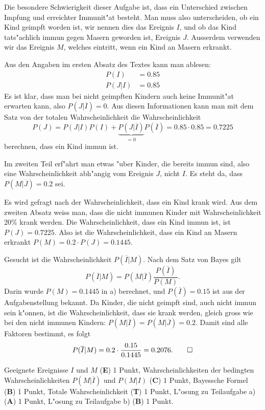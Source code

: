 \begin{loesung}
Die besondere Schwierigkeit dieser Aufgabe ist, dass ein Unterschied
zwischen Impfung und erreichter Immunit"at besteht.
Man muss also unterscheiden, ob ein Kind geimpft worden ist, wir nennen
dies das Ereignis $I$, und ob das Kind tats"achlich immun gegen Masern
geworden ist, Ereignis $J$. 
Ausserdem verwenden wir das Ereignis $M$, welches eintritt, wenn ein
Kind an Masern erkrankt.

Aus den Angaben im ersten Absatz des Textes kann man ablesen:
\begin{align*}
P(I)&=0.85
\\
P(J|I)&=0.85
\end{align*}
Es ist klar, dass man bei nicht geimpften Kindern auch keine Immunit"at
erwarten kann, also $P(J|\overline{I})=0$.
Aus diesen Informationen kann man mit dem Satz von der totalen
Wahrscheinlichkeit
die Wahrscheinlichkeit
\[
P(J)
=
P(J|I)P(I) + \underbrace{P(J|\overline{I})}_{\displaystyle=0}P(\overline{I})
= 
0.85 \cdot 0.85=0.7225
\]
berechnen, dass ein Kind immun ist.

Im zweiten Teil erf"ahrt man etwas "uber Kinder, die bereits immun sind,
also eine Wahrscheinlichkeit abh"angig vom Ereignis $J$, nicht $I$.
Es steht da, dass $P(M|\overline{J})=0.2$ sei.

\begin{teilaufgaben}
\item
Es wird gefragt nach der Wahrscheinlichkeit, dass ein Kind krank wird.
Aus dem zweiten Absatz weiss man, dass die nicht immunen Kinder mit
Wahrscheinlichkeit 20\% krank werden.
Die Wahrscheinlichkeit, dass ein Kind immun ist, ist $P(J)=0.7225$.
Also ist die Wahrscheinlichkeit, dass ein Kind an Masern erkrankt
$P(M)=0.2\cdot P(J)=0.1445$.
\item
Gesucht ist die Wahrscheinlichkeit $P(\overline{I}|M)$.
Nach dem Satz von Bayes gilt
\[
P(\overline{I}|M)
=
P(M|\overline{I})\frac{P(\overline{I})}{P(M)}.
\]
Darin wurde $P(M)=0.1445$ in a) berechnet, und $P(\overline{I})=0.15$
ist aus der Aufgabenstellung bekannt.
Da Kinder, die nicht geimpft sind, auch nicht immun sein k"onnen,
ist die Wahrscheinlichkeit, dass sie krank werden, gleich gross wie
bei den nicht immunen Kindern: $P(M|\overline{I})=P(M|\overline{J})=0.2$.
Damit sind alle Faktoren bestimmt, es folgt
\[
P(\overline{I}|M)
=
0.2\cdot\frac{0.15}{0.1445}
=
0.2076.
\qedhere
\]
\end{teilaufgaben}
\end{loesung}

\begin{bewertung}
Geeignete Ereignisse $I$ und $M$ ({\bf E}) 1 Punkt,
Wahrscheinlichkeiten der bedingten Wahrscheinlichkeiten $P(M|\overline{I})$
und $P(M|I)$ ({\bf C}) 1 Punkt,
Bayessche Formel ({\bf B}) 1 Punkt,
Totale Wahrscheinlichkeit ({\bf T}) 1 Punkt,
L"osung zu Teilaufgabe a) ({\bf A}) 1 Punkt,
L"osung zu Teilaufgabe b) ({\bf B}) 1 Punkt.
\end{bewertung}

